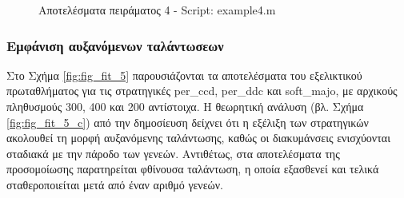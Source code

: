 \documentclass[12pt]{report}
\begin{document}
\begin{figure}[htbp]
    \caption{Αποτελέσματα πειράματος 4 - \foreignlanguage{english}{Script: example4.m}}
    \label{fig:fig_fit_4}
\end{figure}

\subsubsection{Εμφάνιση αυξανόμενων ταλάντωσεων}
Στο Σχήμα \ref{fig:fig_fit_5} παρουσιάζονται τα αποτελέσματα του εξελικτικού πρωταθλήματος για τις στρατηγικές \foreignlanguage{english}{per\_ccd}, \foreignlanguage{english}{per\_ddc} και \foreignlanguage{english}{soft\_majo}, με αρχικούς πληθυσμούς 300, 400 και 200 αντίστοιχα. Η θεωρητική ανάλυση (βλ. Σχήμα \ref{fig:fig_fit_5_c}) από την δημοσίευση δείχνει ότι η εξέλιξη των στρατηγικών ακολουθεί τη μορφή αυξανόμενης ταλάντωσης, καθώς οι διακυμάνσεις ενισχύονται σταδιακά με την πάροδο των γενεών. Αντιθέτως, στα αποτελέσματα της προσομοίωσης παρατηρείται φθίνουσα ταλάντωση, η οποία εξασθενεί και τελικά σταθεροποιείται μετά από έναν αριθμό γενεών.
\end{document}
